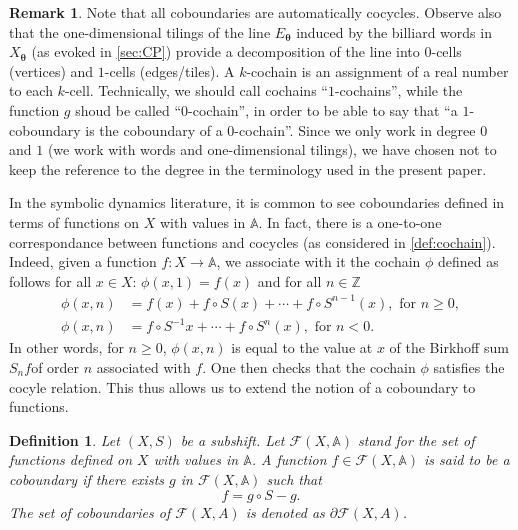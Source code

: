 \documentclass{article}
\newtheorem{definition}[lemma]{Definition}
\theoremstyle{definition}
\newtheorem{remark}[lemma]{Remark}
\newcommand{\Z}{\mathbb{Z}}
\newcommand{\bA}{\mathbb{A}}
\newcommand{\btheta}{\boldsymbol{\theta}}
\begin{document}
\begin{remark} Note that all  coboundaries are automatically cocycles. 
Observe also that the one-dimensional  tilings of   the line $E_{\btheta}$ induced by the billiard words   in $X_{\btheta}$ (as  evoked in \cref{sec:CP}) provide  a decomposition of 
 the line   into $0$-cells (vertices) and  $1$-cells (edges/tiles). A $k$-cochain is an assignment of a real number to each $k$-cell.
Technically, we should call cochains ``$1$-cochains'', while the function $g$  shoud be called   ``$0$-cochain'', in order to be able to say
 that  ``a $1$-coboundary is the coboundary of a $0$-cochain''. Since we only work in degree $0$ and $1$  (we work with words and one-dimensional tilings), we have chosen   not  to    keep 
 the reference to  the degree  in the  terminology  used in the present paper.  \end{remark} 
 In the symbolic dynamics  literature, it is common to see coboundaries defined in terms of  functions   on $X$ with  values in $\bA$. In fact,  there is  a one-to-one correspondance  between   functions and cocycles (as considered  in \cref{def:cochain}).
Indeed,  given  a  function $f: X \rightarrow \bA$,   we  associate with it  the cochain  $\phi$ defined  as follows
    for all $x \in X$:   $\phi(x,1)= f(x)$ and for all $n \in \Z$
 \begin{equation}\label{eq-cocycle-base}
 \begin{array}{ll}
  \phi(x,n) & =f(x) + f\circ S(x) + \cdots + f \circ  S^{n-1}(x), \mbox{ for } n \geq 0,\\
 \phi(x,n) &=f \circ S^{-1}x+  \cdots + f \circ  S^{n}(x), \mbox{ for } n <0.
 \end{array}
 \end{equation}
In other words,  for $n \geq 0$,  $ \phi(x,n)$   is equal to   the value at $x$ of  the Birkhoff sum  $S_n f$of order $n$ associated with $f$.   
  One then  checks that  the cochain $\phi$ satisfies the  cocyle relation. This thus  allows us to extend the notion of  a coboundary to functions.
   \begin{definition} Let $(X,S)$ be a subshift.
      Let ${\mathcal F} (X,\bA)$ stand for the set of  functions  defined on $X$ with  values in $\bA$.
A function   $f  \in {\mathcal F} (X,\bA)$ is said to be a coboundary if there exists  $g$ in ${\mathcal F} (X,\bA)$
such that 
\begin{equation}\label{eq:cob2}
f=g \circ S-g.
\end{equation}
   The set of coboundaries  of  ${\mathcal F}(X,A)$ is denoted as  $\partial  {\mathcal F}(X,A)$.
   \end{definition}
   
\end{document}
